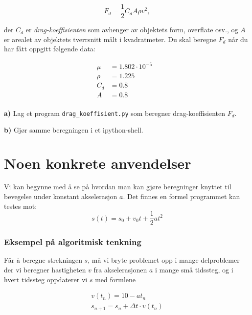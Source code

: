 \documentclass[11pt]{article}
\begin{document}
\[ F_d = \frac{1}{2}C_dA\rho v^2, \]

der \(C_d\) er \emph{drag-koeffisienten} som avhenger av objektets form,
overflate osv., og \(A\) er arealet av objektets tverrsnitt målt i
kvadratmeter. Du skal beregne \(F_d\) når du har fått oppgitt følgende
data:

\begin{align*}
\mu & = 1.802\cdot10^{-5} & \\
\rho & = 1.225 & \\
C_d & = 0.8 & \\
A & = 0.8 & \\
\end{align*}

\textbf{a)} Lag et program \texttt{drag\_koeffisient.py} som beregner
drag-koeffisienten \(F_d\).

\textbf{b)} Gjør samme beregningen i et ipython-shell.

    \hypertarget{noen-konkrete-anvendelser}{%
\section{Noen konkrete anvendelser}\label{noen-konkrete-anvendelser}}

    Vi kan begynne med å se på hvordan man kan gjøre beregninger knyttet til
bevegelse under konstant akselerasjon \(a\). Det finnes en formel
programmet kan testes mot: \[ s(t) = s_0 + v_0t + \frac{1}{2}at^2 \]

    

    \hypertarget{eksempel-puxe5-algoritmisk-tenkning}{%
\subsubsection{Eksempel på algoritmisk
tenkning}\label{eksempel-puxe5-algoritmisk-tenkning}}

Får å beregne strekningen \(s\), må vi bryte problemet opp i mange
delproblemer der vi beregner hastigheten \(v\) fra akselerasjonen \(a\)
i mange små tidssteg, og i hvert tidssteg oppdaterer vi \(s\) med
formlene

\begin{align*}
v(t_n) = 10 - at_n \\[1.2em]
s_{n+1} = s_{n} + \Delta t \cdot v(t_n)
\end{align*}
\end{document}
